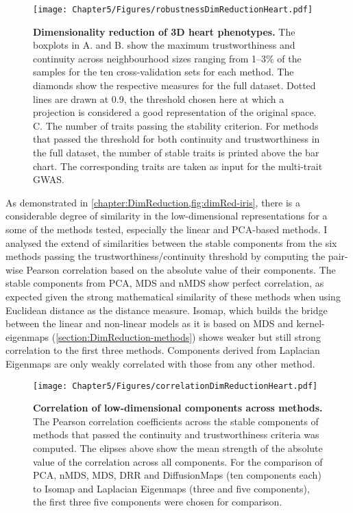 \begin{figure}[h!]
	\centering
	\texttt{[image: Chapter5/Figures/robustnessDimReductionHeart.pdf]}
	\caption[\textbf{Dimensionality reduction of 3D heart phenotypes. }]{\textbf{Dimensionality reduction of 3D heart phenotypes. } The boxplots in A. and B. show the maximum trustworthiness and continuity across neighbourhood sizes ranging from \numrange{1}{3}\% of the samples for the ten cross-validation sets for each method. The diamonds show the respective measures for the full dataset. Dotted lines are drawn at \num{0.9}, the threshold chosen here at which a projection is considered a good representation of the original space. C. The number of traits passing the stability criterion. For methods that passed the threshold for both continuity and trustworthiness in the full dataset, the number of stable traits is printed above the bar chart. The corresponding traits are taken as input for the multi-trait GWAS.}
	 	\label{fig:dimRed-heart}
\end{figure}
%
As demonstrated in \cref{chapter:DimReduction,fig:dimRed-iris}, there is a considerable degree of similarity in the low-dimensional representations for a some of the methods tested, especially the linear and PCA-based methods. I analysed the extend of similarities between the stable components from the six methods passing the trustworthiness/continuity threshold by computing the pair-wise Pearson correlation based on the absolute value of their components.  The stable components from PCA, MDS and nMDS show perfect correlation, as expected given the strong mathematical similarity of these methods when using Euclidean distance as the distance measure. Isomap, which builds the bridge between the linear and non-linear models as it is based on MDS and kernel-eigenmaps (\cref{section:DimReduction-methods}) shows weaker but still strong correlation to the first three methods. Components derived from Laplacian Eigenmaps are only weakly correlated with those from any other method. 
%
\begin{figure}[t]
	\centering
	\texttt{[image: Chapter5/Figures/correlationDimReductionHeart.pdf]}
	\caption[\textbf{Correlation of low-dimensional components across methods. }]{\textbf{Correlation of low-dimensional components across methods. } The Pearson correlation coefficients across the stable components of methods that passed the continuity and trustworthiness criteria was computed. The elipses above show the mean strength of the absolute value of the correlation across all components. For the comparison of PCA, nMDS, MDS, DRR and DiffusionMaps (ten components each) to Isomap and Laplacian Eigenmaps (three and five components), the first three five components were chosen for comparison.}
	 	\label{fig:dimRed-correlation}
\end{figure}
